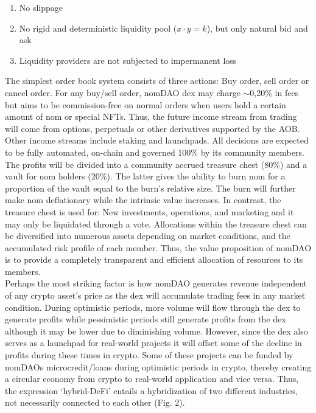 \documentclass[12pt]{article}
\begin{document}
\begin{enumerate}

\item No slippage

\item No rigid and deterministic liquidity pool ($x \cdot y = k$), but only natural bid and ask

\item Liquidity providers are not subjected to impermanent loss\cite{il}

\end{enumerate}

The simplest order book system consists of three actions: Buy order, sell order or cancel order. For any buy/sell order, nomDAO dex may charge $\sim$0,20$\%$ in fees but aims to be commission-free on normal orders when users hold a certain amount of nom or special NFTs. Thus, the future income stream from trading will come from options, perpetuals or other derivatives supported by the AOB. Other income streams include staking and launchpads. All decisions are expected to be fully automated, on-chain and governed 100$\%$ by its community members. The profits will be divided into a community accrued treasure chest (80$\%$) and a vault for nom holders (20$\%$). The latter gives the ability to burn \cite{burn} nom for a proportion of the vault equal to the burn's relative size. The burn will further make nom deflationary while the intrinsic value increases. In contrast, the treasure chest is used for: New investments, operations, and marketing and it may only be liquidated through a vote. Allocations within the treasure chest can be diversified into numerous assets depending on market conditions, and the accumulated risk profile of each member. Thus, the value proposition of nomDAO is to provide a completely transparent and efficient allocation of resources to its members. \\

Perhaps the most striking factor is how nomDAO generates revenue independent of any crypto asset's price as the dex will accumulate trading fees in any market condition. During optimistic periods, more volume will flow through the dex to generate profits while pessimistic periods still generate profits from the dex although it may be lower due to diminishing volume. However, since the dex also serves as a launchpad for real-world projects it will offset some of the decline in profits during these times in crypto. Some of these projects can be funded by nomDAOs microcredit/loans during optimistic periods in crypto, thereby creating a circular economy from crypto to real-world application and vice versa. Thus, the expression ‘hybrid-DeFi’ entails a hybridization of two different industries, not necessarily connected to each other (Fig. 2). \\
\end{document}
